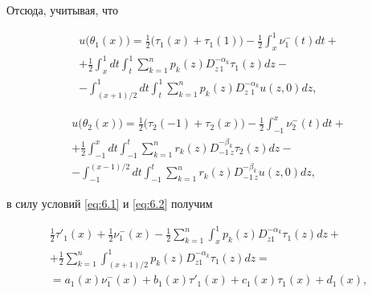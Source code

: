 Отсюда, учитывая, что

\begin{multline}

u\bigl( {{\theta _1}(x)} \bigr) = \frac12 \bigl({{{\tau _1}(x) + {\tau _1}(1)}}\bigr)  - \frac{1}{2} \int _x^1 {\nu _1^ - (t)dt}  + \\

+ \frac{1}{2} \int _x^1

{dt \int _t^1 {\sum\limits_{k = 1}^n {{p_k}(z)} } D_{z\,1}^{ - {\alpha _k}}{\tau _1}(z)dz}  -

\\

-  \int _{({{x + 1}})/{2}}^1

{dt \int _t^1 {\sum\limits_{k = 1}^n {{p_k}(z)D_{z\,\,1}^{ - {\alpha _k}}u(z, 0)} d} } z,

\end{multline}

\begin{multline}

u\bigl( {{\theta _2}(x)} \bigr) = \frac12 \bigl({{{\tau _2}( - 1) + {\tau _2}(x)}}\bigr) - \frac{1}{2} \int _{ - 1}^x {\nu _2^ - (t)dt}  +

\\

+

\frac{1}{2} \int _{ - 1}^x {dt \int _{ - 1}^t {\sum\limits_{k = 1}^n {{r_k}(z)} } D_{ - 1\,z}^{ - {\beta _k}}{\tau _2}(z)dz} -

\\ 

-  \int _{

- 1}^{({{x - 1}})/{2}} {dt \int _{ - 1}^t {\sum\limits_{k = 1}^n {{r_k}(z)D_{ - 1\,z}^{ - {\beta _k}}u(z, 0)} d} } z,

\end{multline}

в силу условий \eqref{eq:6.1} и \eqref{eq:6.2}  получим

\begin{multline}

\frac{1}{2}{\tau '_1}(x) + \frac{1}{2}\nu _1^ - (x) - \frac{1}{2}\sum\limits_{k = 1}^n { \int _x^1 {{p_k}(z)D_{z1}^{ - {\alpha _k}}{\tau _1}(z)dz} } +

\\

+ \frac{1}{2}\sum\limits_{k = 1}^n { \int _{({{x + 1}})/{2}}^1 {{p_k}(z)D_{z1}^{ - {\alpha _k}}{\tau _1}(z)dz} }  = 

\\

 = {a_1}(x)\nu _1^ - (x) + {b_1}(x){\tau '_1}(x) + {c_1}(x){\tau _1}(x) + {d_1}(x), \label{eq:12.1}

\end{multline}

